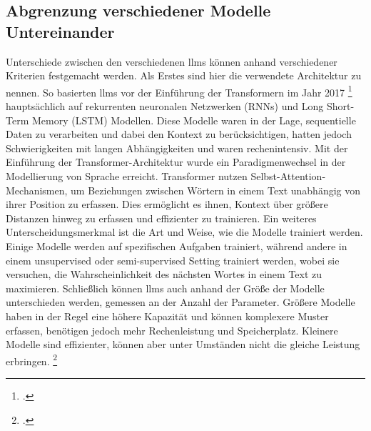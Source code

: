 \subsection{Abgrenzung verschiedener Modelle Untereinander} \label{sec:abgrenzung}
Unterschiede zwischen den verschiedenen \acp{llm} können anhand verschiedener Kriterien festgemacht werden.
Als Erstes sind hier die verwendete Architektur zu nennen.
So basierten \acp{llm} vor der Einführung der Transformern im Jahr 2017 \footcite[Vgl.][S. 1]{vaswani2023attention} hauptsächlich auf rekurrenten neuronalen Netzwerken (RNNs) und Long Short-Term Memory (LSTM) Modellen.
Diese Modelle waren in der Lage, sequentielle Daten zu verarbeiten und dabei den Kontext zu berücksichtigen, hatten jedoch Schwierigkeiten mit langen Abhängigkeiten und waren rechenintensiv.
Mit der Einführung der Transformer-Architektur wurde ein Paradigmenwechsel in der Modellierung von Sprache erreicht. Transformer nutzen Selbst-Attention-Mechanismen, um Beziehungen zwischen Wörtern in einem Text unabhängig von ihrer Position zu erfassen. Dies ermöglicht es ihnen, Kontext über größere Distanzen hinweg zu erfassen und effizienter zu trainieren.
Ein weiteres Unterscheidungsmerkmal ist die Art und Weise, wie die Modelle trainiert werden. Einige Modelle werden auf spezifischen Aufgaben trainiert, während andere in einem unsupervised oder semi-supervised Setting trainiert werden, wobei sie versuchen, die Wahrscheinlichkeit des nächsten Wortes in einem Text zu maximieren.
Schließlich können \acp{llm} auch anhand der Größe der Modelle unterschieden werden, gemessen an der Anzahl der Parameter.
Größere Modelle haben in der Regel eine höhere Kapazität und können komplexere Muster erfassen, benötigen jedoch mehr Rechenleistung und Speicherplatz.
Kleinere Modelle sind effizienter, können aber unter Umständen nicht die gleiche Leistung erbringen. \footcite[Vgl.][S. 1]{lv2023parameter}
